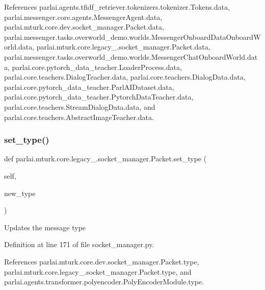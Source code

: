 References parlai.\+agents.\+tfidf\+\_\+retriever.\+tokenizers.\+tokenizer.\+Tokens.\+data, parlai.\+messenger.\+core.\+agents.\+Messenger\+Agent.\+data, parlai.\+mturk.\+core.\+dev.\+socket\+\_\+manager.\+Packet.\+data, parlai.\+messenger.\+tasks.\+overworld\+\_\+demo.\+worlds.\+Messenger\+Onboard\+Data\+Onboard\+World.\+data, parlai.\+mturk.\+core.\+legacy\+\_.\+socket\+\_\+manager.\+Packet.\+data, parlai.\+messenger.\+tasks.\+overworld\+\_\+demo.\+worlds.\+Messenger\+Chat\+Onboard\+World.\+data, parlai.\+core.\+pytorch\+\_\+data\+\_\+teacher.\+Loader\+Process.\+data, parlai.\+core.\+teachers.\+Dialog\+Teacher.\+data, parlai.\+core.\+teachers.\+Dialog\+Data.\+data, parlai.\+core.\+pytorch\+\_\+data\+\_\+teacher.\+Parl\+A\+I\+Dataset.\+data, parlai.\+core.\+pytorch\+\_\+data\+\_\+teacher.\+Pytorch\+Data\+Teacher.\+data, parlai.\+core.\+teachers.\+Stream\+Dialog\+Data.\+data, and parlai.\+core.\+teachers.\+Abstract\+Image\+Teacher.\+data.

\mbox{\label{classparlai_1_1mturk_1_1core_1_1legacy__2018_1_1socket__manager_1_1Packet_a268873d6b357e25768ce83ed2ad605f6}} 
\subsubsection{\texorpdfstring{set\+\_\+type()}{set\_type()}}
{\footnotesize\ttfamily def parlai.\+mturk.\+core.\+legacy\+\_.\+socket\+\_\+manager.\+Packet.\+set\+\_\+type (\begin{DoxyParamCaption}\item[{}]{self,  }\item[{}]{new\+\_\+type }\end{DoxyParamCaption})}

\begin{DoxyVerb}Updates the message type\end{DoxyVerb}
 

Definition at line 171 of file socket\+\_\+manager.\+py.



References parlai.\+mturk.\+core.\+dev.\+socket\+\_\+manager.\+Packet.\+type, parlai.\+mturk.\+core.\+legacy\+\_.\+socket\+\_\+manager.\+Packet.\+type, and parlai.\+agents.\+transformer.\+polyencoder.\+Poly\+Encoder\+Module.\+type.

